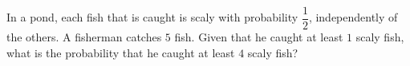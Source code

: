 In a pond, each fish that is caught is scaly with probability $\dfrac12$, independently of the others. A fisherman catches $5$ fish. Given that he caught at least $1$ scaly fish, what is the probability that he caught at least $4$ scaly fish?
